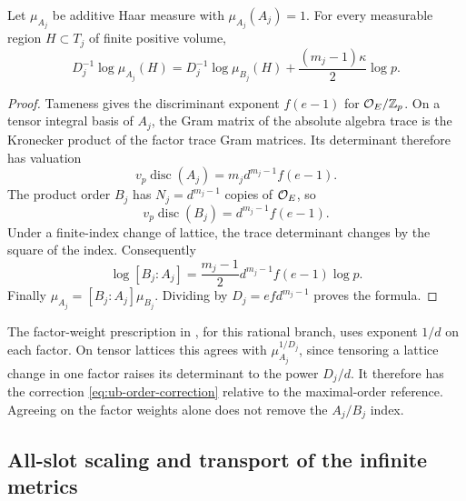 \begin{proposition}\label{prop:ub-order-correction}
Let $\mu_{A_j}$ be additive Haar measure with $\mu_{A_j}(A_j)=1$.
For every measurable region $H\subset T_j$ of finite positive
volume,
\begin{equation}\label{eq:ub-order-correction}
 D_j^{-1}\log\mu_{A_j}(H)
   =D_j^{-1}\log\mu_{B_j}(H)
           +\frac{(m_j-1)\kappa}{2}\log p.
\end{equation}
\end{proposition}

\begin{proof}
Tameness gives the discriminant exponent $f(e-1)$ for
$\mathcal O_E/\mathbb Z_p$. On a tensor integral basis of $A_j$, the Gram matrix
of the absolute algebra trace is the Kronecker product of the
factor trace Gram matrices. Its determinant therefore has
valuation
\[
 v_p\operatorname{disc}(A_j)=m_jd^{m_j-1}f(e-1).
\]
The product order $B_j$ has $N_j=d^{m_j-1}$ copies of $\mathcal O_E$, so
\[
 v_p\operatorname{disc}(B_j)=d^{m_j-1}f(e-1).
\]
Under a finite-index change of lattice, the trace determinant
changes by the square of the index. Consequently
\[
 \log[B_j:A_j]
   =\frac{m_j-1}{2}d^{m_j-1}f(e-1)\log p.
\]
Finally $\mu_{A_j}=[B_j:A_j]\mu_{B_j}$. Dividing by
$D_j=efd^{m_j-1}$ proves the formula.
\end{proof}

The factor-weight prescription in
\cite[(9.10.3.1), (9.10.5.1)]{JoshiIII}, for this rational branch,
uses exponent $1/d$ on each factor. On tensor lattices this agrees
with $\mu_{A_j}^{1/D_j}$, since tensoring a lattice change in one
factor raises its determinant to the power $D_j/d$.
It therefore has the correction
\eqref{eq:ub-order-correction} relative to the maximal-order
reference. Agreeing on the factor weights alone does not remove
the $A_j/B_j$ index.

\subsection{All-slot scaling and transport of the infinite metrics}

